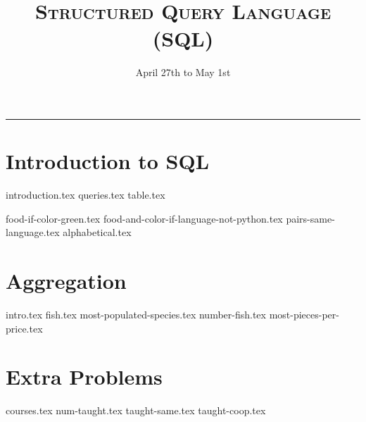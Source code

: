 \documentclass{exam}
\title{\textsc{Structured Query Language (SQL)}}
\date{April 27th to May 1st}
\begin{document}
\maketitle
\rule{\textwidth}{0.15em}
\fontsize{12}{15}\selectfont


\section{Introduction to SQL}
{introduction.tex}
{queries.tex}
\newpage
{table.tex}
\begin{questions}
{food-if-color-green.tex}
{food-and-color-if-language-not-python.tex}
{pairs-same-language.tex}
{alphabetical.tex}

\newpage
\section{Aggregation}
{intro.tex}
{fish.tex}
{most-populated-species.tex}
{number-fish.tex}
{most-pieces-per-price.tex}


\newpage
\section{Extra Problems}
{courses.tex}
{num-taught.tex}
{taught-same.tex}
{taught-coop.tex}

\end{questions}
\end{document}
